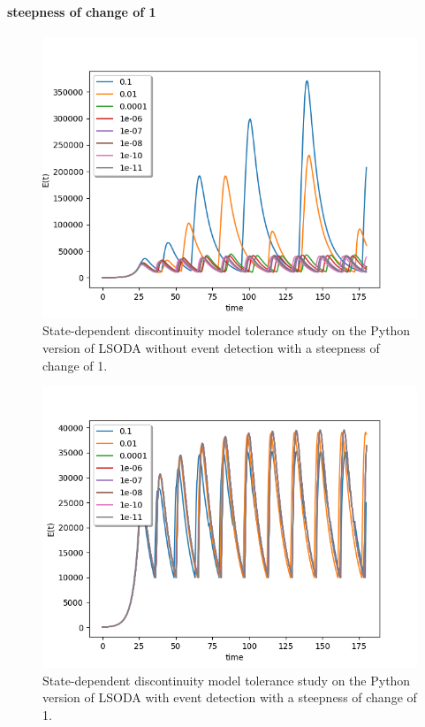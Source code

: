 \paragraph{steepness of change of 1}
\begin{figure}[H]
\centering
\includegraphics[width=0.7\linewidth]{./figures/exp_state_tol_lsoda_no_event_1}
\caption{State-dependent discontinuity model tolerance study on the Python version of LSODA without event detection with a steepness of change of 1.}
\label{fig:exp_state_tol_lsoda_no_event_1}
\end{figure}

\begin{figure}[H]
\centering
\includegraphics[width=0.7\linewidth]{./figures/exp_state_tol_lsoda_event_1}
\caption{State-dependent discontinuity model tolerance study on the Python version of LSODA with event detection with a steepness of change of 1.}
\label{fig:exp_state_tol_lsoda_event_1}
\end{figure}

